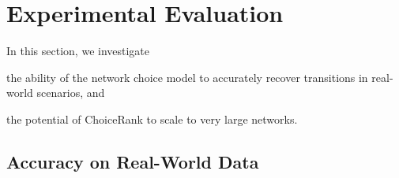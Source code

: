 \section{Experimental Evaluation}  %
\label{sec:experiments}

In this section, we investigate
\begin{enuminline}
\item the ability of the network choice model to accurately recover transitions in real-world scenarios, and
\item the potential of ChoiceRank to scale to very large networks.
\end{enuminline}

\subsection{Accuracy on Real-World Data}
\label{sec:accuracy}

